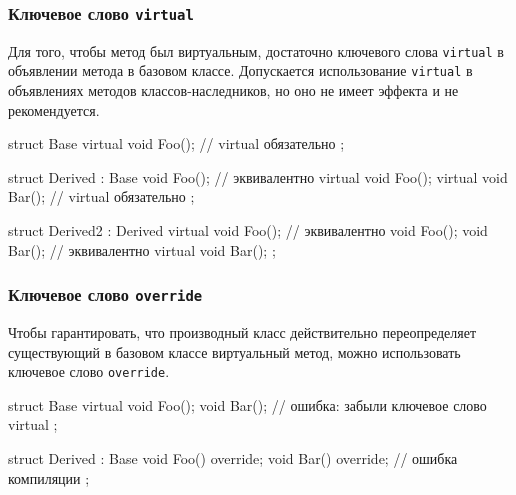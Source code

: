 \documentclass[compress, 8pt, aspectratio=169]{beamer}
\begin{document}
\begin{frame}[fragile]

    \frametitle{Ключевое слово \texttt{virtual}}

    \hfill\break
    Для того, чтобы метод был виртуальным, достаточно ключевого слова
    \verb|virtual|\footnotemark{} в объявлении метода в базовом классе.
    Допускается использование \verb|virtual| в объявлениях методов
    классов-наследников, но оно не имеет эффекта и не рекомендуется.


    \begin{myinplacelisting}[minted language=cpp]
struct Base {
    virtual void Foo(); // virtual обязательно
};

struct Derived : Base {
    void Foo(); // эквивалентно virtual void Foo();
    virtual void Bar(); // virtual обязательно
};

struct Derived2 : Derived {
    virtual void Foo(); // эквивалентно void Foo();
    void Bar(); // эквивалентно virtual void Bar();
};
    \end{myinplacelisting}

\end{frame}

\begin{frame}[fragile]

    \frametitle{Ключевое слово \texttt{override}}

    Чтобы гарантировать, что производный класс действительно переопределяет
    существующий в базовом классе виртуальный метод, можно использовать ключевое
    слово \texttt{override}\footnotemark{}.


    \begin{myinplacelisting}[minted language=cpp]
struct Base {
    virtual void Foo();
    void Bar(); // ошибка: забыли ключевое слово virtual
};

struct Derived : Base {
    void Foo() override;
    void Bar() override; // ошибка компиляции
};
    \end{myinplacelisting}

\end{frame}
\end{document}
